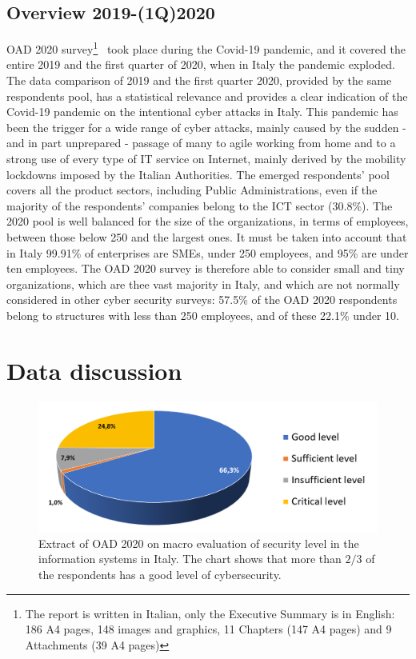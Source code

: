\documentclass{easychair}
\begin{document}
\subsection{Overview 2019-(1Q)2020}

OAD 2020 survey\footnote{The report is written in Italian, only the Executive Summary is in English: 186 A4 pages, 148 images and graphics, 11 Chapters
(147 A4 pages) and 9 Attachments (39 A4 pages)}~\cite{oad20} took place during the Covid-19 pandemic, and it covered the entire 2019 and the first quarter 
of 2020, when in Italy the pandemic exploded. The data comparison of 2019 and the first quarter 2020, provided by the same respondents pool, has a statistical relevance and provides a 
clear indication of the Covid-19 pandemic on the intentional cyber attacks in Italy. This pandemic has been the trigger for a wide range of cyber attacks, mainly 
caused by the sudden - and in part unprepared - passage of many to agile working from home and to a strong use of every type of IT service on Internet, mainly
derived by the mobility lockdowns imposed by the Italian Authorities. The emerged respondents’ pool covers all the product sectors, including Public Administrations,
even if the majority of the respondents’ companies belong to the ICT sector (30.8\%). The 2020 pool is well balanced for the size of the organizations, in terms
of employees, between those below 250 and the largest ones. It must be taken into account that in Italy 99.91\% \cite{istat20} %
of enterprises are SMEs, under 250 employees, and 95\% are under ten employees. The OAD 2020 survey is therefore able to consider small and 
tiny organizations, which are thee vast majority in Italy, and which are not normally considered in other cyber security surveys: 57.5\% of the OAD 2020 respondents
belong to structures with less than 250 employees, and of these 22.1\% under 10. 

\section{Data discussion}\label{sec:DataDiscussion}

\begin{figure}
	\centering
		\includegraphics[width=1\textwidth]{pictures/fig1.png}
		\caption{Extract of OAD 2020 \cite{oad20} on macro evaluation of security level in the information systems in Italy. The chart shows that more than $ 2/3 $ of the respondents has a good level of cybersecurity.}
		\label{fig:1}
\end{figure}
\end{document}

